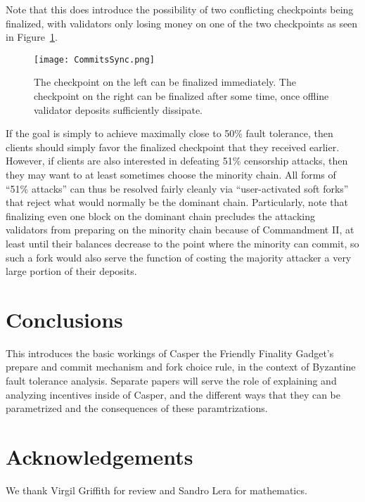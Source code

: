 \documentclass[12pt, final]{article}
\newcommand{\figref}[1]{Figure~\ref{#1}}
\begin{document}
Note that this does introduce the possibility of two conflicting checkpoints being finalized, with validators only losing money on one of the two checkpoints as seen in \figref{fig:commitsync}.

\begin{figure}[h!tb]
\centering
\texttt{[image: CommitsSync.png]}
\caption{The checkpoint on the left can be finalized immediately. The checkpoint on the right can be finalized after some time, once offline validator deposits sufficiently dissipate.}
\label{fig:commitsync}
\end{figure}

If the goal is simply to achieve maximally close to 50\% fault tolerance, then clients should simply favor the finalized checkpoint that they received earlier. However, if clients are also interested in defeating 51\% censorship attacks, then they may want to at least sometimes choose the minority chain. All forms of ``51\% attacks'' can thus be resolved fairly cleanly via ``user-activated soft forks'' that reject what would normally be the dominant chain. Particularly, note that finalizing even one block on the dominant chain precludes the attacking validators from preparing on the minority chain because of Commandment II, at least until their balances decrease to the point where the minority can commit, so such a fork would also serve the function of costing the majority attacker a very large portion of their deposits.

\section{Conclusions}

This introduces the basic workings of Casper the Friendly Finality Gadget's prepare and commit mechanism and fork choice rule, in the context of Byzantine fault tolerance analysis. Separate papers will serve the role of explaining and analyzing incentives inside of Casper, and the different ways that they can be parametrized and the consequences of these paramtrizations.

\section{Acknowledgements}

We thank Virgil Griffith for review and Sandro Lera for mathematics.





%

\end{document}
